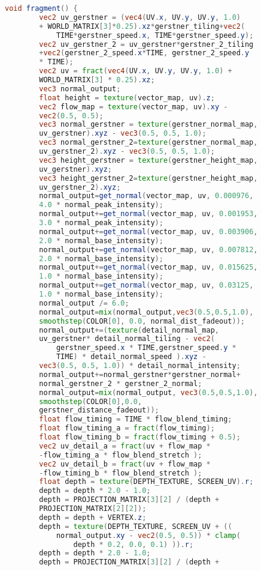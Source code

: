 \begin{lstlisting}[language=GLSL, caption={\label{cf:agua} \textit{Shader} de efeito de água na Unity}]
	void fragment() {
		vec2 uv_gerstner = (vec4(UV.x, UV.y, UV.y, 1.0) 
		+ WORLD_MATRIX[3]*0.25).xz*gerstner_tiling+vec2(
			TIME*gerstner_speed.x, TIME*gerstner_speed.y);
		vec2 uv_gerstner_2 = uv_gerstner*gerstner_2_tiling 
		+vec2(gerstner_2_speed.x*TIME, gerstner_2_speed.y 
		* TIME);
		vec2 uv = fract(vec4(UV.x, UV.y, UV.y, 1.0) + 
		WORLD_MATRIX[3] * 0.25).xz;
		vec3 normal_output;
		float height = texture(vector_map, uv).z;
		vec2 flow_map = texture(vector_map, uv).xy - 
		vec2(0.5, 0.5);
		vec3 normal_gerstner = texture(gerstner_normal_map, 
		uv_gerstner).xyz - vec3(0.5, 0.5, 1.0);
		vec3 normal_gerstner_2=texture(gerstner_normal_map, 
		uv_gerstner_2).xyz - vec3(0.5, 0.5, 1.0);
		vec3 height_gerstner = texture(gerstner_height_map, 
		uv_gerstner).xyz;
		vec3 height_gerstner_2=texture(gerstner_height_map, 
		uv_gerstner_2).xyz;
		normal_output=get_normal(vector_map, uv, 0.000976, 
		4.0 * normal_peak_intensity); 
		normal_output+=get_normal(vector_map, uv, 0.001953, 
		3.0 * normal_peak_intensity); 
		normal_output+=get_normal(vector_map, uv, 0.003906, 
		2.0 * normal_base_intensity); 
		normal_output+=get_normal(vector_map, uv, 0.007812, 
		2.0 * normal_base_intensity); 
		normal_output+=get_normal(vector_map, uv, 0.015625, 
		1.0 * normal_base_intensity); 
		normal_output+=get_normal(vector_map, uv, 0.03125, 
		1.0 * normal_base_intensity); 
		normal_output /= 6.0;
		normal_output=mix(normal_output,vec3(0.5,0.5,1.0), 
		smoothstep(COLOR[0], 0.0, normal_dist_fadeout));
		normal_output+=(texture(detail_normal_map,
		uv_gerstner* detail_normal_tiling - vec2(
			gerstner_speed.x * TIME,gerstner_speed.y * 
			TIME) * detail_normal_speed ).xyz - 
		vec3(0.5, 0.5, 1.0)) * detail_normal_intensity;
		normal_output+=normal_gerstner*gerstner_normal+ 
		normal_gerstner_2 * gerstner_2_normal;
		normal_output=mix(normal_output, vec3(0.5,0.5,1.0), 
		smoothstep(COLOR[0],0.0,
		gerstner_distance_fadeout));
		float flow_timing = TIME * flow_blend_timing;
		float flow_timing_a = fract(flow_timing);
		float flow_timing_b = fract(flow_timing + 0.5);
		vec2 uv_detail_a = fract(uv + flow_map * 
		-flow_timing_a * flow_blend_stretch );
		vec2 uv_detail_b = fract(uv + flow_map * 
		-flow_timing_b * flow_blend_stretch );
		float depth = texture(DEPTH_TEXTURE, SCREEN_UV).r;
		depth = depth * 2.0 - 1.0;
		depth = PROJECTION_MATRIX[3][2] / (depth + 
		PROJECTION_MATRIX[2][2]); 
		depth = depth + VERTEX.z;
		depth = texture(DEPTH_TEXTURE, SCREEN_UV + ((
			normal_output.xy - vec2(0.5, 0.5)) * clamp(
				depth * 0.2, 0.0, 0.1) )).r;
		depth = depth * 2.0 - 1.0;
		depth = PROJECTION_MATRIX[3][2] / (depth + 

\end{lstlisting}
